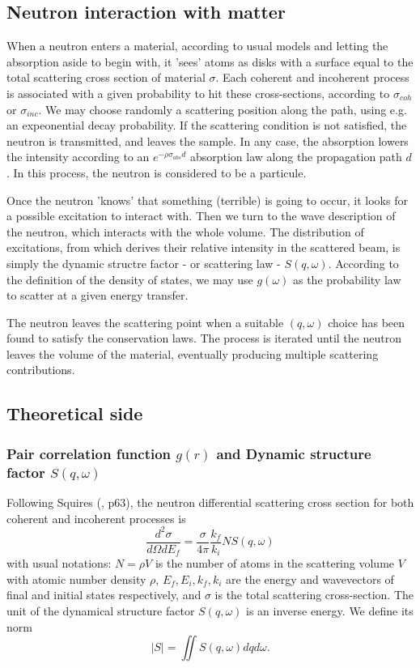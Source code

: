 \subsection{Neutron interaction with matter}

When a neutron enters a material, according to usual models and letting the absorption aside to begin with, it 'sees' atoms as disks with a surface equal to the total scattering cross section of material $\sigma$. Each coherent and incoherent process is associated with a given probability to hit these cross-sections, according to $\sigma_{coh}$ or $\sigma_{inc}$. We may choose randomly a scattering position along the path, using e.g. an expeonential decay probability. If the scattering condition is not satisfied, the neutron is transmitted, and leaves the sample. In any case, the absorption lowers the intensity according to an $e^{-\rho \sigma_{abs}d}$ absorption law along the propagation path $d$. In this process, the neutron is considered to be a particule.

Once the neutron 'knows' that something (terrible) is going to occur, it looks for a possible excitation to interact with. Then we turn to the wave description of the neutron, which interacts with the whole volume. The distribution of excitations, from which derives their relative intensity in the scattered beam, is simply the dynamic structre factor - or scattering law - $S(q,\omega)$. According to the definition of the density of states, we may use $g(\omega)$ as the probability law to scatter at a given energy transfer.

The neutron leaves the scattering point when a suitable $(q, \omega)$ choice has been found to satisfy the conservation laws. The process is iterated until the neutron leaves the volume of the material, eventually producing multiple scattering contributions.

\subsection{Theoretical side}

\subsubsection{Pair correlation function $g(r)$ and Dynamic structure factor $S(q,\omega)$}

Following Squires (\cite{squires}, p63), the neutron differential scattering cross section for both coherent and incoherent processes is
\begin{equation}\label{eq:d2sigma}
\frac{d^2\sigma}{d\Omega dE_f} = \frac{\sigma}{4\pi}\frac{k_f}{k_i} N S(q, \omega)
\end{equation}
with usual notations: $N=\rho V$ is the number of atoms in the scattering volume $V$ with atomic number density $\rho$, $E_f, E_i, k_f, k_i$ are the energy and wavevectors of final and initial states respectively, and $\sigma$ is the total scattering cross-section. The unit of the dynamical structure factor $S(q,\omega)$ is an inverse energy. We define its norm
\begin{equation}
|S| = \iint S(q,\omega) dq d\omega .
\end{equation}

